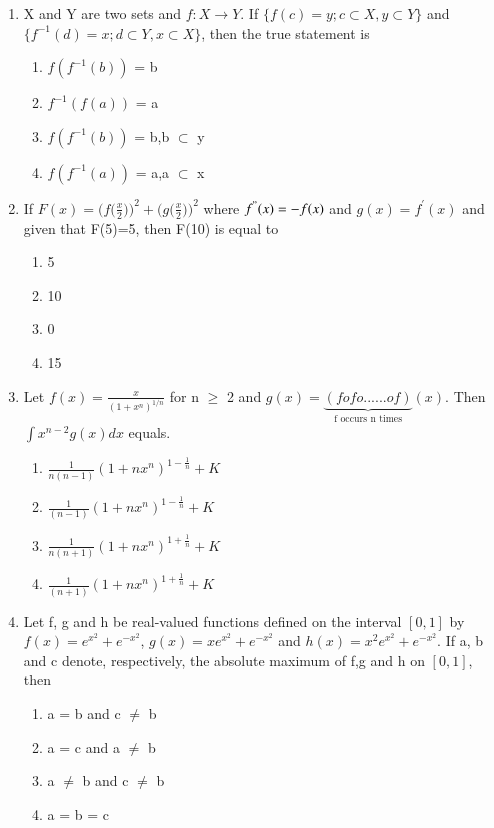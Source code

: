 \begin{enumerate}[label=\arabic*.,ref=\thesubsection.\theenumi]
\item X and Y are two sets and $f: X \rightarrow Y$. If $\{ f(c)=y; c \subset X, y \subset Y \}$ and  
$\{ f^{-1}(d) = x; d \subset Y, x \subset X \}$, then the true statement is
\begin{enumerate}
\item $f(f^{-1}(b))$ = b
\item $f^{-1}(f(a))$ = a
\item $f(f^{-1}(b))$ = b,b $\subset$ y
\item $f(f^{-1}(a))$ = a,a $\subset$ x
\end{enumerate} 

\item If $F(x) = \Big(f\Big(\frac{x}{2}\Big)\Big)^2+\Big(g\Big(\frac{x}{2}\Big)\Big)^2$ where $f^{"}(x)= -f(x)$ and $g(x)=f^{'}(x)$ and given that F(5)=5, then F(10) is equal to
\begin{enumerate}
\item 5
\item 10
\item 0
\item 15
\end{enumerate}

\item Let $f(x)=\frac{x}{(1+x^n)^{1/n}}$ for n $\geq$ 2 and $g(x)=
\underbrace{(fofo......of)}_{\text{f occurs n times}}(x)$. Then $\int x^{n-2}g(x)dx$ equals.
\begin{enumerate}
\item $\frac{1}{n(n-1)}(1+nx^n)^{1-\frac{1}{n}}+K$
\item $\frac{1}{(n-1)}(1+nx^n)^{1-\frac{1}{n}}+K$
\item $\frac{1}{n(n+1)}(1+nx^n)^{1+\frac{1}{n}}+K$
\item $\frac{1}{(n+1)}(1+nx^n)^{1+\frac{1}{n}}+K$
\end{enumerate}

\item Let f, g and h be real-valued functions defined on the interval $[0,1]$ by $f(x)=e^{x{^2}}+e^{{-x}^2}$, $g(x)=xe^{x{^2}}+e^{{-x}^2}$ and $h(x)=x^2e^{x{^2}}+e^{{-x}^2}$. If a, b and c denote, respectively, the absolute maximum of f,g and h on $[0,1]$, then
\begin{enumerate}
\item a = b and c $\neq$ b
\item a = c and a $\neq$ b
\item a $\neq$ b and c $\neq$ b
\item a = b = c
\end{enumerate}


\end{enumerate}
